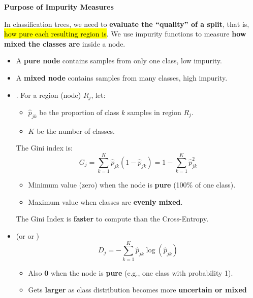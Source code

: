 \highspace
\begin{flushleft}
    \textcolor{Green3}{ \textbf{Purpose of Impurity Measures}}
\end{flushleft}
In classification trees, we need to \textbf{evaluate the ``quality'' of a split}, that is, \hl{how pure each resulting region is}. We use impurity functions to measure \textbf{how mixed the classes are} inside a node.
\begin{itemize}
    \item A \textbf{pure node} contains samples from only one class, low impurity.
    \item A \textbf{mixed node} contains samples from many classes, high impurity.
    \item {}. For a region (node) $R_j$, let:
    \begin{itemize}
        \item $\hat{p}_{jk}$ be the proportion of class $k$ samples in region $R_j$.
        \item $K$ be the number of classes.
    \end{itemize}
    The Gini index is:
    \begin{equation}\label{eq: Gini Index}
        G_j = \sum_{k=1}^K \hat{p}_{jk} \left(1 - \hat{p}_{jk}\right) = 1 - \sum_{k=1}^K \hat{p}_{jk}^2
    \end{equation}
    \begin{itemize}
        \item Minimum value (zero) when the node is \textbf{pure} (100\% of one class).
        \item Maximum value when classes are \textbf{evenly mixed}.
    \end{itemize}
    The Gini Index is \textbf{faster} to compute than the Cross-Entropy.
    \item {} (or  or )
    \begin{equation}\label{eq: Cross-Entropy}
        D_j = -\sum_{k=1}^K \hat{p}_{jk} \log\left(\hat{p}_{jk}\right)
    \end{equation}
    \begin{itemize}
        \item Also \textbf{0} when the node is \textbf{pure} (e.g., one class with probability 1).
        \item Gets \textbf{larger} as class distribution becomes more \textbf{uncertain or mixed}
    \end{itemize}
\end{itemize}